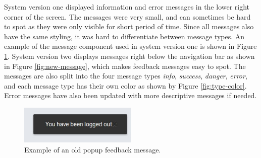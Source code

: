 System version one displayed information and error messages in the lower right corner of the screen. The messages were very small, and can sometimes be hard to spot as they were only visible for short period of time. Since all messages also have the same styling, it was hard to differentiate between message types. An example of the message component used in system version one is shown in Figure \ref{fig:old-message}. System version two displays messages right below the navigation bar as shown in Figure \ref{fig:new-message}, which makes feedback messages easy to spot. The messages are also split into the four message types \textit{info}, \textit{success}, \textit{danger}, \textit{error}, and each message type has their own color as shown by Figure \ref{fig:type-color}. Error messages have also been updated with more descriptive messages if needed. \\

\begin{figure}[t!]
    \centering
    \includegraphics[width=0.5\textwidth]{figs/old_message.jpg}
    \caption[Example of an old popup feedback message]{Example of an old popup feedback message.}
    \label{fig:old-message}
\end{figure}


